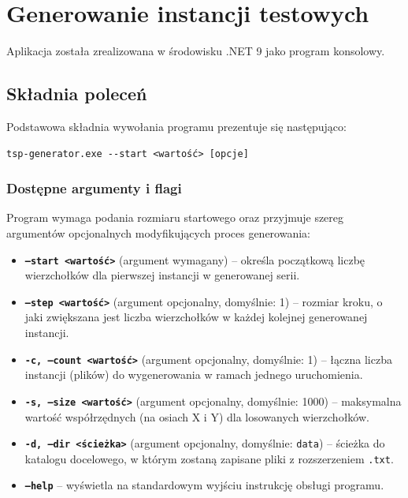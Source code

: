 \documentclass{article}
\theoremstyle{definition}
\theoremstyle{plain}
\theoremstyle{remark}
\begin{document}
\newpage
\section{Generowanie instancji testowych}

Aplikacja została zrealizowana w środowisku .NET 9 jako program konsolowy.

\subsection{Składnia poleceń}

Podstawowa składnia wywołania programu prezentuje się następująco:

\begin{verbatim}
tsp-generator.exe --start <wartość> [opcje]
\end{verbatim}

\subsubsection{Dostępne argumenty i flagi}

Program wymaga podania rozmiaru startowego oraz przyjmuje szereg argumentów opcjonalnych modyfikujących proces generowania:

\begin{itemize}
    \item \textbf{\texttt{---start <wartość>}} (argument wymagany) -- określa początkową liczbę wierzchołków dla pierwszej instancji w generowanej serii.
    
    \item \textbf{\texttt{---step <wartość>}} (argument opcjonalny, domyślnie: 1) -- rozmiar kroku, o jaki zwiększana jest liczba wierzchołków w każdej kolejnej generowanej instancji.
    
    \item \textbf{\texttt{-c, ---count <wartość>}} (argument opcjonalny, domyślnie: 1) -- łączna liczba instancji (plików) do wygenerowania w ramach jednego uruchomienia.
    
    \item \textbf{\texttt{-s, ---size <wartość>}} (argument opcjonalny, domyślnie: 1000) -- maksymalna wartość współrzędnych (na osiach X i Y) dla losowanych wierzchołków.
    
    \item \textbf{\texttt{-d, ---dir <ścieżka>}} (argument opcjonalny, domyślnie: \texttt{data}) -- ścieżka do katalogu docelowego, w którym zostaną zapisane pliki z rozszerzeniem \texttt{.txt}.
    
    \item \textbf{\texttt{---help}} -- wyświetla na standardowym wyjściu instrukcję obsługi programu.
\end{itemize}
\end{document}
